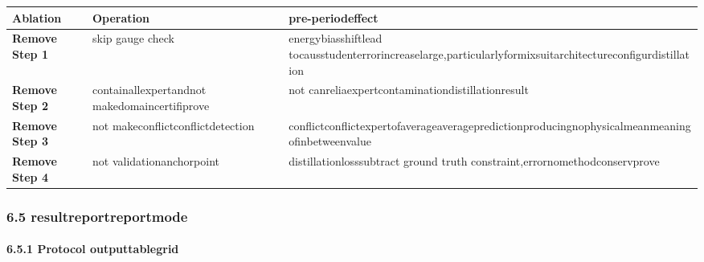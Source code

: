 \documentclass[
  12pt,
]{article}
\begin{document}
\begin{longtable}[]{@{}
  >{\raggedright\arraybackslash}p{}
  >{\raggedright\arraybackslash}p{}
  >{\raggedright\arraybackslash}p{}@{}}
\toprule\noalign{}
\begin{minipage}[b]{\linewidth}\raggedright
Ablation
\end{minipage} & \begin{minipage}[b]{\linewidth}\raggedright
Operation
\end{minipage} & \begin{minipage}[b]{\linewidth}\raggedright
pre-periodeffect
\end{minipage} \\
\midrule\noalign{}
\endhead
\bottomrule\noalign{}
\endlastfoot
\textbf{Remove Step 1} & skip gauge check &
energybiasshiftlead tocausstudenterrorincreaselarge,particularlyformixsuitarchitectureconfigurdistillation \\
\textbf{Remove Step 2} & containallexpertandnot makedomaincertifiprove &
not canreliaexpertcontaminationdistillationresult \\
\textbf{Remove Step 3} & not makeconflictconflictdetection &
conflictconflictexpertofaverageaveragepredictionproducingnophysicalmeanmeaningofinbetweenvalue \\
\textbf{Remove Step 4} & not validationanchorpoint & distillationlosssubtract ground truth
constraint,errornomethodconservprove \\
\end{longtable}

\subsubsection{6.5
resultreportreportmode }\label{ux7ed3ux679cux62a5ux544aux6a21ux677f}

\paragraph{6.5.1 Protocol
outputtablegrid}\label{protocol-ux8f93ux51faux8868ux683c}
\end{document}
